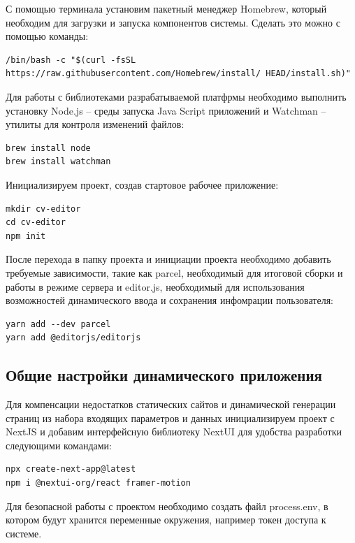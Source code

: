 \documentclass[master, och, diploma]{SCWorks}
\begin{document}
С помощью терминала установим пакетный менеджер Homebrew, который необходим для загрузки и запуска компонентов системы. Сделать это можно с помощью команды:
\begin{verbatim}
/bin/bash -c "$(curl -fsSL https://raw.githubusercontent.com/Homebrew/install/ HEAD/install.sh)"
\end{verbatim}

Для работы с библиотеками разрабатываемой платфрмы необходимо выполнить установку Node.js – среды запуска Java Script приложений и Watchman – утилиты для контроля изменений файлов:
\begin{verbatim}
brew install node
brew install watchman
\end{verbatim}

Инициализируем проект, создав стартовое рабочее приложение:
\begin{verbatim}
mkdir cv-editor
cd cv-editor
npm init
\end{verbatim}

После перехода в папку проекта и инициации проекта необходимо добавить требуемые зависимости, такие как parcel, необходимый для итоговой сборки и работы в режиме сервера и editor.js, необходимый для использования возможностей динамического ввода и сохранения инфомрации пользователя:
\begin{verbatim}
yarn add --dev parcel
yarn add @editorjs/editorjs
\end{verbatim}



\subsection{Общие настройки динамического приложения}
Для компенсации недостатков статических сайтов и динамической генерации страниц из набора входящих параметров и данных инициализируем проект с NextJS и добавим интерфейсную библиотеку NextUI для удобства разработки следующими командами:
\begin{verbatim}
npx create-next-app@latest
npm i @nextui-org/react framer-motion
\end{verbatim}

Для безопасной работы с проектом необходимо создать файл process.env, в котором будут хранится переменные окружения, например токен доступа к системе.
\end{document}
